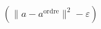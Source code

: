 \documentclass[preview]{standalone}
\begin{document}
\begin{align*}
(\|a - a^{\text{ordre}}\|^2 - \varepsilon)
\end{align*}
\end{document}
